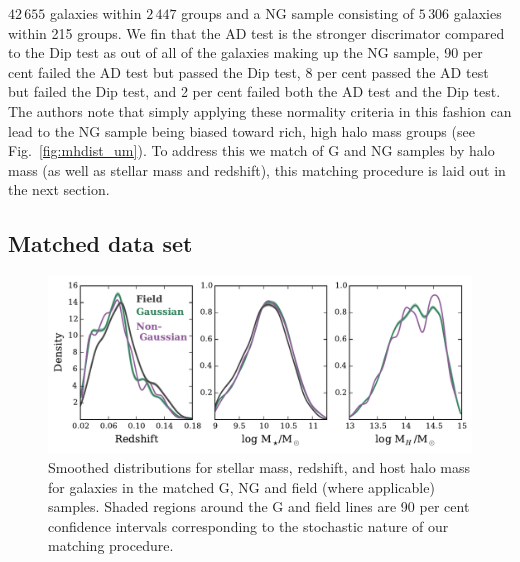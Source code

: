 \documentclass[a4paper,fleqn,usenatbib]{mnras}
\begin{document}
$42\,655$ galaxies within $2\,447$ groups and a NG sample consisting of $5\,306$
galaxies within 215 groups.  We fin that the AD test is the stronger discrimator
compared to the Dip test as out of all of the galaxies making up the
NG sample, 90 per cent failed the AD test but passed the Dip test, 8
per cent passed the AD test but failed the Dip test, and 2 per cent
failed both the AD test and the Dip test.  The authors note that simply applying
these normality criteria in this fashion can lead to the NG sample
being biased toward rich, high halo mass groups (see
Fig.~\ref{fig:mhdist_um}).  To address this we
match of G and NG samples by halo mass (as well as stellar mass and
redshift), this matching procedure is laid out in the next section.

\subsection{Matched data set}

\begin{figure}
  \centering
  \includegraphics[width=\textwidth]{dist_m2_s.pdf}
  \caption{Smoothed distributions for stellar mass, redshift, and host
    halo mass for galaxies in the matched G, NG and field (where
    applicable) samples.  Shaded regions around the G and field lines
    are 90 per cent confidence intervals corresponding to the
    stochastic nature of our matching procedure.}
  \label{fig:dist_m2_s}
\end{figure}
\end{document}
